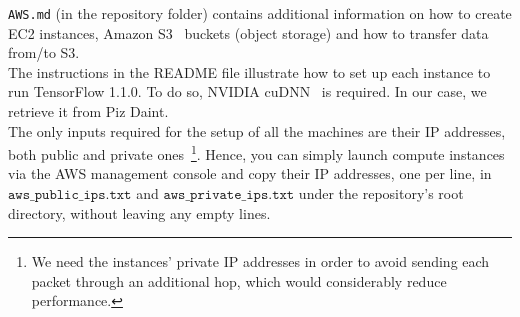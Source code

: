\texttt{AWS.md} (in the repository folder) contains additional information on how to create EC2 instances, Amazon S3~\cite{s3} buckets (object storage) and how to transfer data from/to S3.\\
The instructions in the README file illustrate how to set up each instance to run TensorFlow 1.1.0.
To do so, NVIDIA cuDNN~\cite{cudnn} is required.
In our case, we retrieve it from Piz Daint.\\
The only inputs required for the setup of all the machines are their IP addresses, both public and private ones~\footnote{We need the instances' private IP addresses in order to avoid sending each packet through an additional hop, which would considerably reduce performance.}.
Hence, you can simply launch compute instances via the AWS management console and copy their IP addresses, one per line, in $\texttt{aws\_public\_ips.txt}$ and $\texttt{aws\_private\_ips.txt}$ under the repository's root directory, without leaving any empty lines.